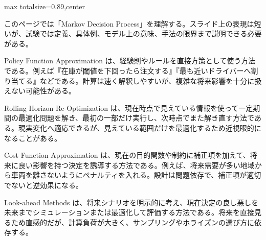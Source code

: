 \begin{minipage}[t]{0.58\textwidth}
\begin{adjustbox}{max totalsize={\textwidth}{0.89\textheight},center}
\begin{minipage}{\textwidth}\scriptsize
{}このページでは「Markov Decision Process」を理解する。スライド上の表現は短いが、試験では定義、具体例、モデル上の意味、手法の限界まで説明できる必要がある。\par
Policy Function Approximation は、経験則やルールを直接方策として使う方法である。例えば『在庫が閾値を下回ったら注文する』『最も近いドライバーへ割り当てる』などである。計算は速く解釈しやすいが、複雑な将来影響を十分に扱えない可能性がある。\par
Rolling Horizon Re-Optimization は、現在時点で見えている情報を使って一定期間の最適化問題を解き、最初の一部だけ実行し、次時点でまた解き直す方法である。現実変化へ適応できるが、見えている範囲だけを最適化するため近視眼的になることがある。\par
Cost Function Approximation は、現在の目的関数や制約に補正項を加えて、将来に良い影響を持つ決定を誘導する方法である。例えば、将来需要が多い地域から車両を離さないようにペナルティを入れる。設計は問題依存で、補正項が適切でないと逆効果になる。\par
Look-ahead Methods は、将来シナリオを明示的に考え、現在決定の良し悪しを未来までシミュレーションまたは最適化して評価する方法である。将来を直接見るため直感的だが、計算負荷が大きく、サンプリングやホライズンの選び方に依存する。\par

\end{minipage}
\end{adjustbox}
\end{minipage}
